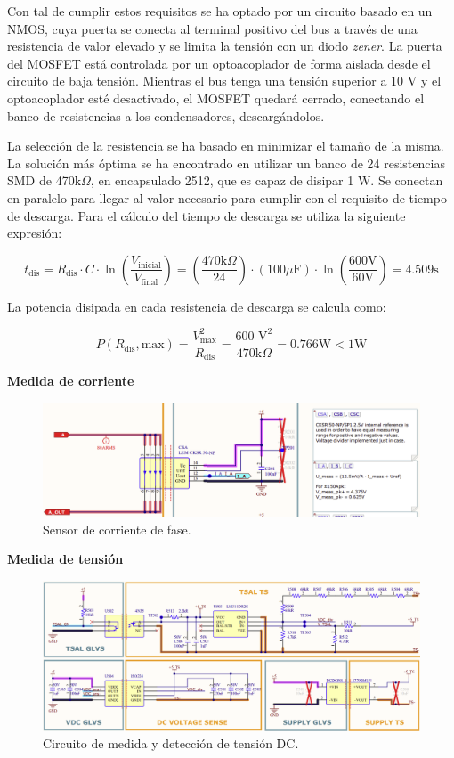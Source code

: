 Con tal de cumplir estos requisitos se ha optado por un circuito basado en un NMOS, cuya puerta se conecta al terminal positivo del bus a través de una resistencia de valor elevado y se limita la tensión con un diodo \textit{zener}. La puerta del MOSFET está controlada por un optoacoplador de forma aislada desde el circuito de baja tensión. Mientras el bus tenga una tensión superior a 10 V y el optoacoplador esté desactivado, el MOSFET quedará cerrado, conectando el banco de resistencias a los condensadores, descargándolos.

La selección de la resistencia se ha basado en minimizar el tamaño de la misma. La solución más óptima se ha encontrado en utilizar un banco de 24 resistencias SMD de 470k$\Omega$, en encapsulado 2512, que es capaz de disipar 1 W. Se conectan en paralelo para llegar al valor necesario para cumplir con el requisito de tiempo de descarga. Para el cálculo del tiempo de descarga se utiliza la siguiente expresión:

\[
t_{\text{dis}} = R_{\text{dis}} \cdot C \cdot \ln\left(\frac{V_{\text{inicial}}}{V_{\text{final}}}\right) = \left(\frac{470 \text{k}\Omega}{24}\right) \cdot (100 \mu\text{F}) \cdot \ln\left(\frac{600 \text{V}}{60 \text{V}}\right) = 4.509 \text{s}
\]

La potencia disipada en cada resistencia de descarga se calcula como:

\[
P(R_{\text{dis}}, \text{max}) = \frac{V_{\text{max}}^2}{R_{\text{dis}}} = \frac{600\text{ V}^2}{470 \text{k}\Omega} = 0.766 \text{W} < 1 \text{W}
\]

\textbf{Medida de corriente}

\begin{figure}[H]
	\centering
	\includegraphics[width=0.8\linewidth]{fig/Imeas-sch}
	\caption{Sensor de corriente de fase.}
\end{figure}



\textbf{Medida de tensión}
\begin{figure}[H]
	\centering
	\includegraphics[width=0.8\linewidth]{fig/Vmeas-sch}
	\caption{Circuito de medida y detección de tensión DC.}
\end{figure}

